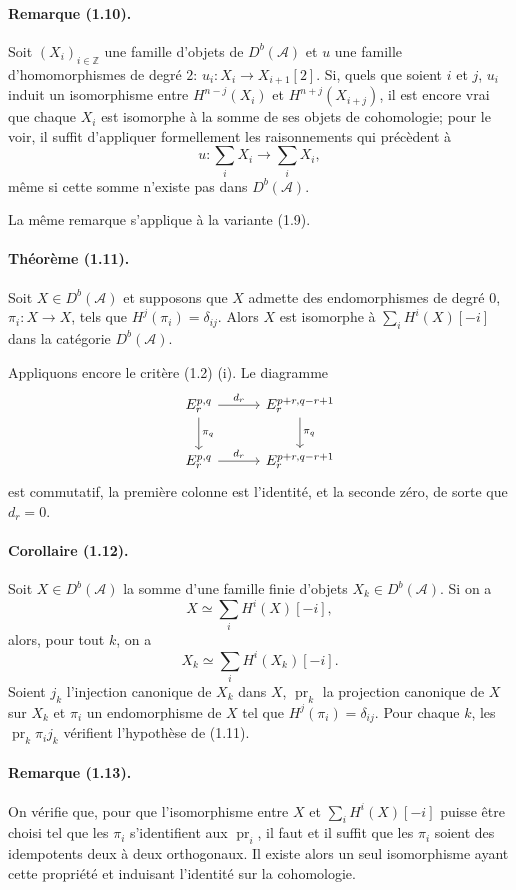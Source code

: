 \documentclass[10pt]{article}
\newcommand{\Acal}{\mathcal A}
\newcommand{\Z}{\mathbb Z}
\newcommand{\Db}{D^b}
\newcommand{\pr}{\operatorname{pr}}
\begin{document}
\paragraph{Remarque (1.10).} Soit $(X_i)_{i\in\Z}$ une famille d'objets de $\Db(\Acal)$ et $u$ une famille d'homomorphismes de degré $2$: $u_i:X_i\to X_{i+1}[2]$. Si, quels que soient $i$ et $j$, $u_i$ induit un isomorphisme entre $H^{n-j}(X_i)$ et $H^{n+j}(X_{i+j})$, il est encore vrai que chaque $X_i$ est isomorphe à la somme de ses objets de cohomologie; pour le voir, il suffit d'appliquer formellement les raisonnements qui précèdent à
\[
u:\sum_iX_i\longrightarrow\sum_iX_i,
\]
même si cette somme n'existe pas dans $\Db(\Acal)$.

La même remarque s'applique à la variante (1.9).

\paragraph{Théorème (1.11).} Soit $X\in\Db(\Acal)$ et supposons que $X$ admette des endomorphismes de degré $0$, $\pi_i:X\to X$, tels que $H^j(\pi_i)=\delta_{ij}$. Alors $X$ est isomorphe à $\sum_iH^i(X)[-i]$ dans la catégorie $\Db(\Acal)$.

Appliquons encore le critère (1.2) (i). Le diagramme
\[
\begin{tikzcd}[column sep=3.0em,row sep=2.2em]
E_r^{p,q} \arrow[r,"d_r"] \arrow[d,"\pi_q"] & E_r^{p+r,q-r+1} \arrow[d,"\pi_q"]\\
E_r^{p,q} \arrow[r,"d_r"] & E_r^{p+r,q-r+1}
\end{tikzcd}
\]
est commutatif, la première colonne est l'identité, et la seconde zéro, de sorte que $d_r=0$.

\paragraph{Corollaire (1.12).} Soit $X\in\Db(\Acal)$ la somme d'une famille finie d'objets $X_k\in\Db(\Acal)$. Si on a
\[
X\simeq\sum_iH^i(X)[-i],
\]
alors, pour tout $k$, on a
\[
X_k\simeq\sum_iH^i(X_k)[-i].
\]
Soient $j_k$ l'injection canonique de $X_k$ dans $X$, $\pr_k$ la projection canonique de $X$ sur $X_k$ et $\pi_i$ un endomorphisme de $X$ tel que $H^j(\pi_i)=\delta_{ij}$. Pour chaque $k$, les $\pr_k\pi_i j_k$ vérifient l'hypothèse de (1.11).

\paragraph{Remarque (1.13).} On vérifie que, pour que l'isomorphisme entre $X$ et $\sum_iH^i(X)[-i]$ puisse être choisi tel que les $\pi_i$ s'identifient aux $\pr_i$, il faut et il suffit que les $\pi_i$ soient des idempotents deux à deux orthogonaux. Il existe alors un seul isomorphisme ayant cette propriété et induisant l'identité sur la cohomologie.
\end{document}
